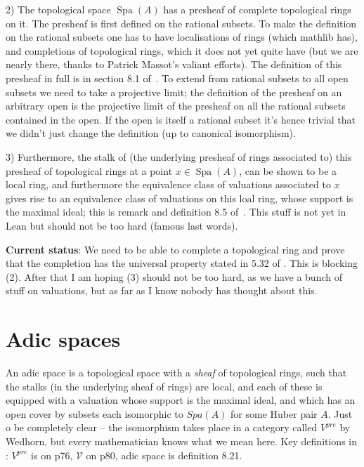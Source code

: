 \documentclass{amsart}
\DeclareMathOperator{\Spa}{Spa}
\theoremstyle{plain}
\theoremstyle{remark}
\begin{document}
2) The topological space $\Spa(A)$ has a presheaf of complete topological rings on it. The presheaf is first defined on the rational subsets. To make the definition on the rational subsets one has to have localisations of rings (which mathlib has), and completions of topological rings, which it does not yet quite have (but we are nearly there, thanks to Patrick Massot's valiant efforts). The definition of this presheaf in full is in section 8.1 of~\cite{wedhorn}. To extend from rational subsets to all open subsets we need to take a projective limit; the definition of the presheaf on an arbitrary open is the projective limit of the presheaf on all the rational subsets contained in the open. If the open is itself a rational subset it's hence trivial that we didn't just change the definition (up to canonical isomorphism). 

3) Furthermore, the stalk of (the underlying presheaf of rings associated to) this presheaf of topological rings at a point $x\in\Spa(A)$, can be shown to be a local ring, and furthermore the equivalence class of valuations associated to $x$ gives rise to an equivalence class of valuations on this loal ring, whose support is the maximal ideal; this is remark and definition 8.5 of~\cite{wedhorn}. This stuff is not yet in Lean but should not be too hard (famous last words).

{\bf Current status}: We need to be able to complete a topological ring and prove that the completion has the universal property stated in 5.32 of \cite{wedhorn}. This is blocking (2). After that I am hoping (3) should not be too hard, as we have a bunch of stuff on valuations, but as far as I know nobody has thought about this.

\section{Adic spaces}

An adic space is a topological space with a \emph{sheaf} of topological rings, such that the stalks (in the underlying sheaf of rings) are local, and each of these is equipped with a valuation whose support is the maximal ideal, and which has an open cover by subsets each isomorphic to $Spa(A)$ for some Huber pair $A$. Just o be completely clear -- the isomorphism takes place in a category called $V^{pre}$ by Wedhorn, but every mathematician knows what we mean here. Key definitions in \cite{wedhorn}: $V^{pre}$ is on p76, $\mathcal{V}$ on p80, adic space is definition 8.21.
\end{document}
